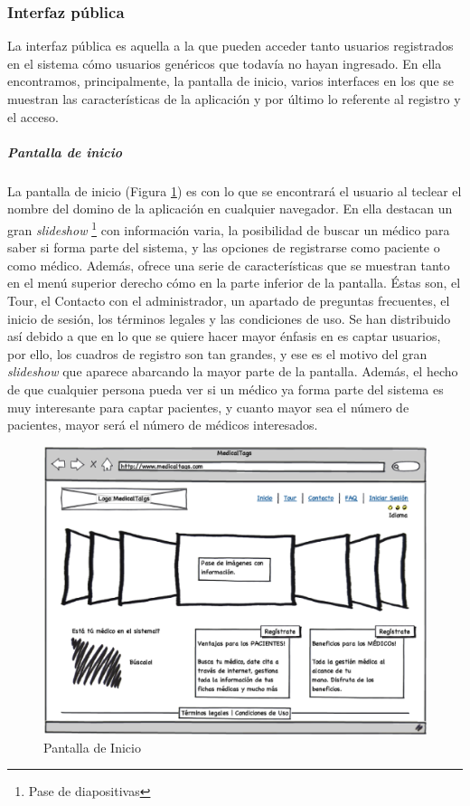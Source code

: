 	\subsubsection{Interfaz pública} %
		\label{sub:iu_interfaz_publica}
		
		La interfaz pública es aquella a la que pueden acceder tanto usuarios registrados en el sistema cómo usuarios genéricos que todavía no hayan ingresado. En ella encontramos, principalmente, la pantalla de inicio, varios interfaces en los que se muestran las características de la aplicación y por último lo referente al registro y el acceso.
		
		\subparagraph{Pantalla de inicio} %
		\label{par:iu_pantalla_de_inicio}
		
		La pantalla de inicio (Figura \ref{fig:iu_pantalla_de_inicio}) es con lo que se encontrará el usuario al teclear el nombre del domino de la aplicación en cualquier navegador. En ella destacan un gran \textit{slideshow} \footnote{Pase de diapositivas} con información varia, la posibilidad de buscar un médico para saber si forma parte del sistema, y las opciones de registrarse como paciente o como médico. Además, ofrece una serie de características que se muestran tanto en el menú superior derecho cómo en la parte inferior de la pantalla. Éstas son, el Tour, el Contacto con el administrador, un apartado de preguntas frecuentes, el inicio de sesión, los términos legales y las condiciones de uso. Se han distribuido así debido a que en lo que se quiere hacer mayor énfasis en es captar usuarios, por ello, los cuadros de registro son tan grandes, y ese es el motivo del gran \textit{slideshow} que aparece abarcando la mayor parte de la pantalla. Además, el hecho de que cualquier persona pueda ver si un médico ya forma parte del sistema es muy interesante para captar pacientes, y cuanto mayor sea el número de pacientes, mayor será el número de médicos interesados.
	
		
		\begin{figure}[H]
		  \centering
		    \includegraphics[width=15cm]{img/eps/1_Inicio.eps}
		  \caption{Pantalla de Inicio}
		  \label{fig:iu_pantalla_de_inicio}
		\end{figure}
			
